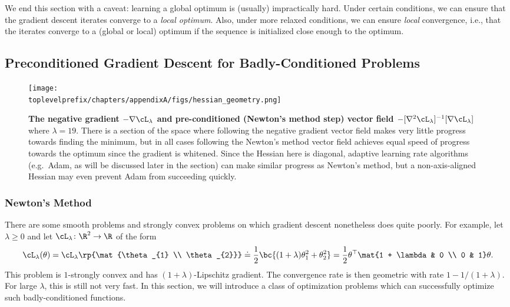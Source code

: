 \documentclass[../../book-main.tex]{subfiles}
\begin{document}
We end this section with a caveat: learning a global optimum is (usually) impractically hard. Under certain conditions, we can ensure that the gradient descent iterates converge to a \textit{local optimum}. Also, under more relaxed conditions, we can ensure \textit{local} convergence, i.e., that the iterates converge to a (global or local) optimum if the sequence is initialized close enough to the optimum.



\subsection{Preconditioned Gradient Descent for Badly-Conditioned Problems}


\begin{figure}
    \texttt{[image: \\toplevelprefix/chapters/appendixA/figs/hessian\_geometry.png]}
    \caption{\small\textbf{The negative gradient \(-\nabla \cL_{\lambda}\) and pre-conditioned (Newton's method step) vector field \(-[\nabla^{2}\cL_{\lambda}]^{-1}[\nabla \cL_{\lambda}]\)} where \(\lambda = 19\). There is a section of the space where following the negative gradient vector field makes very little progress towards finding the minimum, but in all cases following the Newton's method vector field achieves equal speed of progress towards the optimum since the gradient is whitened. Since the Hessian here is diagonal, adaptive learning rate algorithms (e.g.~Adam, as will be discussed later in the section) can make similar progress as Newton's method, but a non-axis-aligned Hessian may even prevent Adam from succeeding quickly.}
    \label{fig:hessian_geometry}
\end{figure}

\subsubsection{Newton's Method}

There are some smooth problems and strongly convex problems on which gradient descent nonetheless does quite poorly. For example, let \(\lambda \geq 0\) and let \(\cL_{\lambda} \colon \R^{2} \to \R\) of the form 
\begin{equation}
    \cL_{\lambda}(\theta) = \cL_{\lambda}\rp{\mat{\theta_{1} \\ \theta_{2}}} \doteq \frac{1}{2}\bc{(1 + \lambda) \theta_{1}^{2} + \theta_{2}^{2}} = \frac{1}{2}\theta^{\top}\mat{1 + \lambda & 0 \\ 0 & 1}\theta.
\end{equation}
This problem is \(1\)-strongly convex and has \((1 + \lambda)\)-Lipschitz gradient. The convergence rate is then geometric with rate \(1 - 1/(1 + \lambda)\). For large \(\lambda\), this is still not very fast. In this section, we will introduce a class of optimization problems which can successfully optimize such badly-conditioned functions.
\end{document}
